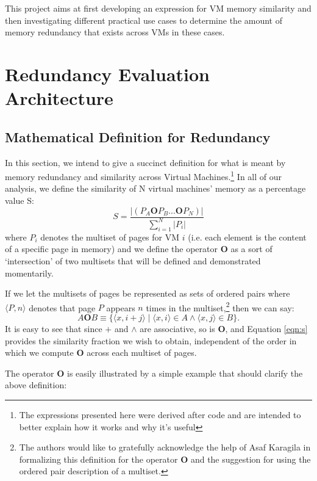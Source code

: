 \documentclass{acm_proc_article-sp}
\newcommand{\tup}[1]{\langle #1\rangle}
\begin{document}
This project aims at first developing an expression for VM memory similarity and then investigating different practical use cases to determine the amount of memory redundancy that exists across VMs in these cases. 

\section{Redundancy Evaluation Architecture}\label{sec:redundancy}

\subsection{Mathematical Definition for Redundancy}\label{sec:red_math}
In this section, we intend to give a succinct definition for what is meant by memory redundancy and similarity across Virtual Machines.\footnote{The expressions presented here were derived after code and are intended to better explain how it works and why it's useful}  In all of our analysis, we define the similarity of N virtual machines' memory as a percentage value S:
\begin{equation}
S = \frac{|(P_A \mathbf{O} P_B ... \mathbf{O} P_N)|}{\sum\limits_{i=1}^{N}|P_i|}
\end{equation}\label{eqn:s}
where $P_i$ denotes the multiset of pages for VM $i$ (i.e. each element is the content of a specific page in memory) and we define the operator $\mathbf{O}$ as a sort of `intersection' of two multisets that will be defined and demonstrated momentarily.  



If we let the multisets of pages be represented as sets of ordered pairs where $\tup{P,n}$ denotes that page $P$ appears $n$ times in the multiset,\footnote{The authors would like to gratefully acknowledge the help of Asaf Karagila in formalizing this definition for the operator $\mathbf{O}$ and the suggestion for using the ordered pair description of a multiset.}
then we can say:
\begin{equation}\label{eqn:s}
A\mathrel{\mathbf{O}}B\equiv\{\tup{x,i+j}\mid\tup{x,i}\in A\land\tup{x,j}\in B\}.
\end{equation}
It is easy to see that since $+$ and $\land$ are associative, so is $\mathbf{O}$, and Equation \ref{eqn:s} provides the similarity fraction we wish to obtain, independent of the order in which we compute $\mathbf{O}$ across each multiset of pages.

The operator $\mathbf{O}$ is easily illustrated by a simple example that should clarify the above definition:
\end{document}
